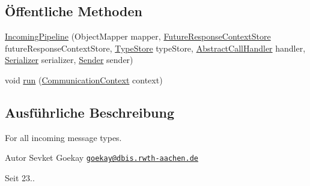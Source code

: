 \subsection*{Öffentliche Methoden}
\begin{DoxyCompactItemize}
\item 
\hyperlink{classde_1_1rwth_1_1idsg_1_1steve_1_1ocpp_1_1ws_1_1pipeline_1_1_incoming_pipeline_a0f80c5d9642b1f81d599a70778d6abbe}{Incoming\-Pipeline} (Object\-Mapper mapper, \hyperlink{interfacede_1_1rwth_1_1idsg_1_1steve_1_1ocpp_1_1ws_1_1_future_response_context_store}{Future\-Response\-Context\-Store} future\-Response\-Context\-Store, \hyperlink{interfacede_1_1rwth_1_1idsg_1_1steve_1_1ocpp_1_1ws_1_1_type_store}{Type\-Store} type\-Store, \hyperlink{classde_1_1rwth_1_1idsg_1_1steve_1_1ocpp_1_1ws_1_1pipeline_1_1_abstract_call_handler}{Abstract\-Call\-Handler} handler, \hyperlink{classde_1_1rwth_1_1idsg_1_1steve_1_1ocpp_1_1ws_1_1pipeline_1_1_serializer}{Serializer} serializer, \hyperlink{classde_1_1rwth_1_1idsg_1_1steve_1_1ocpp_1_1ws_1_1pipeline_1_1_sender}{Sender} sender)
\item 
void \hyperlink{classde_1_1rwth_1_1idsg_1_1steve_1_1ocpp_1_1ws_1_1pipeline_1_1_incoming_pipeline_a4f621debc3b1e630de6ea0d30c4fb995}{run} (\hyperlink{classde_1_1rwth_1_1idsg_1_1steve_1_1ocpp_1_1ws_1_1data_1_1_communication_context}{Communication\-Context} context)
\end{DoxyCompactItemize}


\subsection{Ausführliche Beschreibung}
For all incoming message types.

\begin{DoxyAuthor}{Autor}
Sevket Goekay \href{mailto:goekay@dbis.rwth-aachen.de}{\tt goekay@dbis.\-rwth-\/aachen.\-de} 
\end{DoxyAuthor}
\begin{DoxySince}{Seit}
23.. 
\end{DoxySince}


